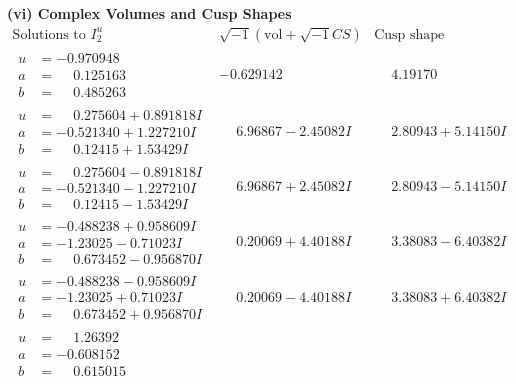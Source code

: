 \documentclass[1p]{elsarticle_modified}
\theoremstyle{definition}
\newcommand{\I}{\sqrt{-1}}
\begin{document}
\newpage\flushleft \textbf{(vi) Complex Volumes and Cusp Shapes}
$$\begin{array}{c|c|c}  
\text{Solutions to }I^u_{2}& \I (\text{vol} + \sqrt{-1}CS) & \text{Cusp shape}\\
 \hline 
\begin{aligned}
u &= -0.970948\phantom{ +0.000000I} \\
a &= \phantom{-}0.125163\phantom{ +0.000000I} \\
b &= \phantom{-}0.485263\phantom{ +0.000000I}\end{aligned}
 & -0.629142\phantom{ +0.000000I} & \phantom{-}4.19170\phantom{ +0.000000I} \\ \hline\begin{aligned}
u &= \phantom{-}0.275604 + 0.891818 I \\
a &= -0.521340 + 1.227210 I \\
b &= \phantom{-}0.12415 + 1.53429 I\end{aligned}
 & \phantom{-}6.96867 - 2.45082 I & \phantom{-}2.80943 + 5.14150 I \\ \hline\begin{aligned}
u &= \phantom{-}0.275604 - 0.891818 I \\
a &= -0.521340 - 1.227210 I \\
b &= \phantom{-}0.12415 - 1.53429 I\end{aligned}
 & \phantom{-}6.96867 + 2.45082 I & \phantom{-}2.80943 - 5.14150 I \\ \hline\begin{aligned}
u &= -0.488238 + 0.958609 I \\
a &= -1.23025 - 0.71023 I \\
b &= \phantom{-}0.673452 - 0.956870 I\end{aligned}
 & \phantom{-}0.20069 + 4.40188 I & \phantom{-}3.38083 - 6.40382 I \\ \hline\begin{aligned}
u &= -0.488238 - 0.958609 I \\
a &= -1.23025 + 0.71023 I \\
b &= \phantom{-}0.673452 + 0.956870 I\end{aligned}
 & \phantom{-}0.20069 - 4.40188 I & \phantom{-}3.38083 + 6.40382 I \\ \hline\begin{aligned}
u &= \phantom{-}1.26392\phantom{ +0.000000I} \\
a &= -0.608152\phantom{ +0.000000I} \\
b &= \phantom{-}0.615015\phantom{ +0.000000I}\end{aligned}

\end{array}$$
\end{document}
